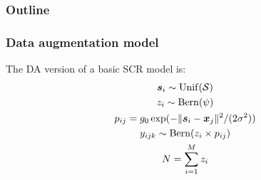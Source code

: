 \documentclass[color=usenames,dvipsnames]{beamer}\usepackage[]{graphicx}\usepackage[]{xcolor}
\begin{document}


\begin{frame}
  \frametitle{Outline}
  \Large
  \tableofcontents[currentsection]
\end{frame}





\begin{frame}
  \frametitle{Data augmentation model}
  The DA version of a basic SCR model is:
  \begin{gather*}
    {\bm s}_i \sim \mathrm{Unif}(\mathcal{S}) \\
    z_i \sim \mathrm{Bern}(\psi) \\
    p_{ij} = g_0\exp(-\|{\bm s}_i-{\bm x}_j\|^2/(2\sigma^2)) \\
    y_{ijk} \sim \mathrm{Bern}(z_i \times p_{ij}) \\
    N=\sum_{i=1}^M z_i
  \end{gather*}
\end{frame}
\end{document}
